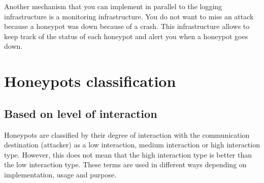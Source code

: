 \documentclass[epsfig,a4paper,11pt,titlepage,oneside,openany]{book}
\begin{document}
Another mechanism that you can implement in parallel to the logging infrastructure is a monitoring infrastructure. You do not want to miss an attack because a honeypot was down because of a crash. This infrastructure allows to keep track of the status of each honeypot and alert you when a honeypot goes down.

\chapter{Honeypots classification}


\section{Based on level of interaction}

Honeypots are classified by their degree of interaction with the communication destination (attacker) as a low interaction, medium interaction or  high interaction type. However, this does not mean that the high interaction type is better than the low interaction type. These terms are used in different ways depending on implementation, usage and purpose.
\end{document}
